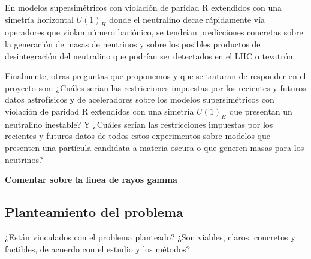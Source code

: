 En modelos supersimétricos con violación de paridad R 
extendidos con una simetría horizontal $U(1)_H$ donde el neutralino decae rápidamente vía operadores 
que violan número bariónico, se tendrían predicciones concretas sobre la generación de masas de neutrinos y sobre los posibles productos de 
desintegración del neutralino que podrían ser detectados en el LHC o tevatrón.

Finalmente, otras preguntas que proponemos y que se trataran de responder en el proyecto son: ¿Cuáles serían las restricciones 
impuestas por los recientes y futuros datos astrofísicos y de aceleradores sobre los modelos supersimétricos con violación de paridad R extendidos con una simetría $U(1)_H$ que presentan un neutralino inestable? Y ¿Cuáles serían las restricciones impuestas por los recientes y futuros datos de todos estos experimentos sobre  modelos que presenten una partícula candidata a materia oscura o que generen masas para los neutrinos?

\textbf{Comentar sobre la linea de rayos gamma \cite{1011.3786}}
\subsection{Planteamiento del problema}
\begin{instrucciones}
  ¿Están vinculados con el problema planteado? ¿Son viables, claros, concretos y factibles, de acuerdo con el estudio y los métodos?
\end{instrucciones}


